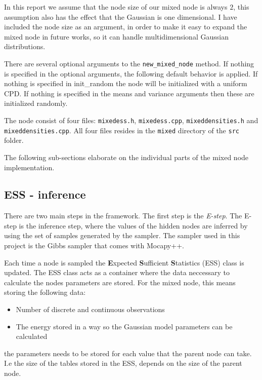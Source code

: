 \documentclass[10pt, journal, compsoc, a4paper]{IEEEtran}
\begin{document}
In this report we assume that the node size of our mixed node is always $2$, this assumption also has the effect that the Gaussian is one dimensional. I have included the node size as an argument, in order to make it easy to expand the mixed node in future works, so it can handle multidimensional Gaussian distributions. 

There are several optional arguments to the \texttt{new\_mixed\_node} method. If nothing is specified in the optional arguments, the following default behavior is applied. If nothing is specified in init\_random the node will be initialized with a uniform CPD. If nothing is specified in the means and variance arguments then these are initialized randomly.

The node consist of four files: \texttt{mixedess.h}, \texttt{mixedess.cpp}, \texttt{mixeddensities.h} and \texttt{mixeddensities.cpp}. All four files resides in the \texttt{mixed} directory of the \texttt{src} folder.

The following sub-sections elaborate on the individual parts of the mixed node implementation.


\subsection{ESS - inference} %
\label{sub:ess}
There are two main steps in the framework. The first step is the \emph{E-step}. The E-step is the inference step, where the values of the hidden nodes are inferred by using the set of samples generated by the sampler. The sampler used in this project is the Gibbs sampler that comes with Mocapy++\cite{mocapymanual}.

Each time a node is sampled the \textbf{E}xpected \textbf{S}ufficient \textbf{S}tatistics (ESS) class is updated. The ESS class acts as a container where the data neccessary to calculate the nodes parameters are stored. For the mixed node, this means storing the following data:

\begin{itemize}
  \item Number of discrete and continuous observations
  \item The energy stored in a way so the Gaussian model parameters can be calculated
\end{itemize}
the parameters needs to be stored for each value that the parent node can take. I.e the size of the tables stored in the ESS, depends on the size of the parent node.
\end{document}
